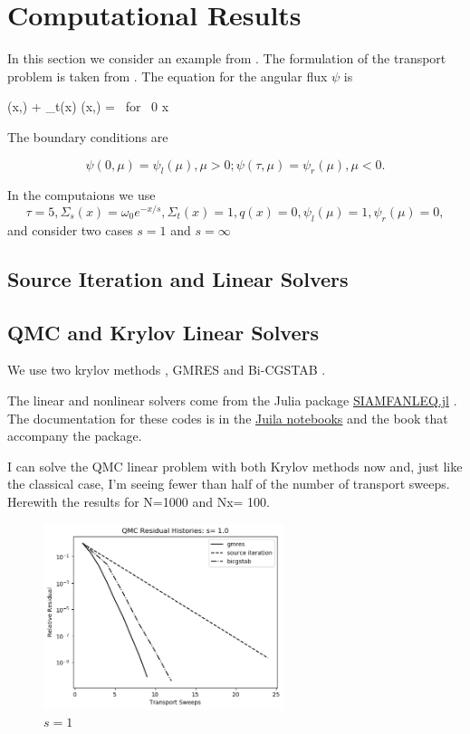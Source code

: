 \section{Computational Results}
\label{sec:results}
In this section we consider an example from
\cite{cesinh}. The formulation of the transport
problem is taken from \cite{ctk:jeff1}. The equation for the angular
flux \(\psi\) is

\begeq
\label{eq:transportgs}
\mu {} (x,\mu) + \Sigma_t(x) \psi(x,\mu) =
 
 \mbox{ for } 0 \le x \le \tau
\endeq

The boundary conditions are

\[
\psi(0, \mu) = \psi_l(\mu), \mu > 0; \psi(\tau, \mu) = \psi_r(\mu),
\mu < 0.
\]

In the computaions we use
\[
\tau=5, \Sigma_s(x) =\omega_0 e^{-x/s},  \Sigma_t(x) = 1, q(x) = 0, \psi_l(\mu) = 1, \psi_r(\mu) = 0,
\]
and consider two cases $s=1$ and $s=\infty$ 

\subsection{Source Iteration and Linear Solvers}
\label{subsec:source}

\subsection{QMC and Krylov Linear Solvers}
\label{subsec:krylov}

We use two krylov methods \cite{ctk:roots}, GMRES \cite{gmres} and
Bi-CGSTAB \cite{bicgstab}.

The linear and nonlinear solvers come from the Julia package
\href{https://github.com/ctkelley/SIAMFANLEquations.jl}{SIAMFANLEQ.jl}
\cite{ctk:siamfanl}. The documentation for these codes is in the
\href{https://github.com/ctkelley/NotebookSIAMFANL}{Juila notebooks}
\cite{ctk:notebooknl} and the book \cite{ctk:fajulia}
that accompany the package. 


I can solve the QMC linear problem with both Krylov methods now and,
just like the classical case, I'm seeing fewer than half of the number
of transport sweeps. Herewith the results for N=1000 and Nx= 100.

\begin{figure}[t]%
  \centering
  \includegraphics[trim = 10mm 0mm 15mm 15mm, width=70mm]{FIGURES/seqone.png}
  \caption{$s = 1$}
  \label{fig:easy}
\end{figure}


